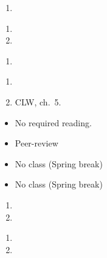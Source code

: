 \documentclass{article}
\begin{document}
\dia{}
\begin{enumerate}
\item {}
\end{enumerate}

\dia{}
\begin{enumerate}
\item {}
\item {}
\end{enumerate}


\dia{}
\begin{enumerate}
\item {}
\end{enumerate}

\dia{}
\begin{enumerate}
\item {}
\item CLW, ch.~5.
\end{enumerate}

\week{}
\dia{}
\begin{itemize}
\item[ ] No required reading.
\end{itemize}

\dia{}
\begin{itemize}
\item[ ] Peer-review
\end{itemize}


\week{}
\dia{}
\begin{itemize}
\item[ ] No class (Spring break)
\end{itemize}

\dia{}
\begin{itemize}
\item[ ] No class (Spring break)
\end{itemize}


\dia{}
\begin{enumerate}
\item {}
\item {}
\end{enumerate}

\dia{}
\begin{enumerate}
\item {}
\item {}
\end{enumerate}
\end{document}
